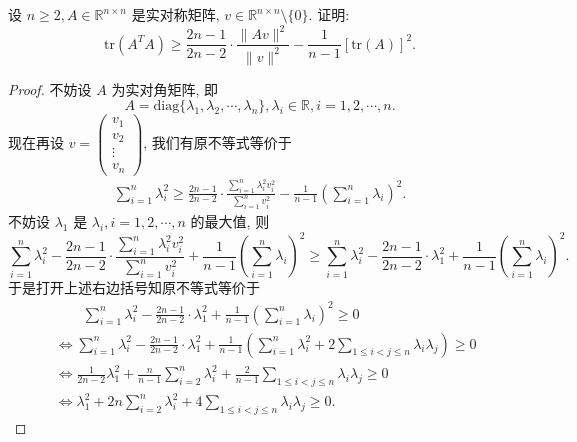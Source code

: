 \documentclass[../../main.tex]{subfiles}
\begin{document}
\begin{example}
设 \( n \geqslant 2, A \in \mathbb{R}^{n \times n} \) 是实对称矩阵, \( v \in \mathbb{R}^{n \times n} \setminus \{0\} \). 证明:
\[
\text{tr}(A^TA) \geqslant \frac{2n - 1}{2n - 2} \cdot \frac{\|Av\|^2}{\|v\|^2} - \frac{1}{n - 1}[\text{tr}(A)]^2.
\]
\end{example}
\begin{proof}
不妨设 \( A \) 为实对角矩阵, 即
\[
A = \text{diag}\{\lambda_1, \lambda_2, \cdots, \lambda_n\}, \lambda_i \in \mathbb{R}, i = 1,2,\cdots, n.
\]
现在再设 \( v = \begin{pmatrix} v_1 \\ v_2 \\ \vdots \\ v_n \end{pmatrix} \), 我们有原不等式等价于
\begin{align*}
\sum\limits_{i=1}^n \lambda_i^2 \geqslant \frac{2n - 1}{2n - 2} \cdot \frac{\sum\limits_{i=1}^n \lambda_i^2 v_i^2}{\sum\limits_{i=1}^n v_i^2} - \frac{1}{n - 1} \left( \sum\limits_{i=1}^n \lambda_i \right)^2. 
\end{align*}
不妨设 \( \lambda_1 \) 是 \( \lambda_i, i = 1,2,\cdots, n \) 的最大值, 则
\[
\sum\limits_{i=1}^n \lambda_i^2 - \frac{2n - 1}{2n - 2} \cdot \frac{\sum\limits_{i=1}^n \lambda_i^2 v_i^2}{\sum\limits_{i=1}^n v_i^2} + \frac{1}{n - 1} \left( \sum\limits_{i=1}^n \lambda_i \right)^2 \geqslant \sum\limits_{i=1}^n \lambda_i^2 - \frac{2n - 1}{2n - 2} \cdot \lambda_1^2 + \frac{1}{n - 1} \left( \sum\limits_{i=1}^n \lambda_i \right)^2.
\]
于是打开上述右边括号知原不等式等价于
\begin{align}
&\quad \quad \sum\limits_{i=1}^n{\lambda _{i}^{2}}-\frac{2n-1}{2n-2}\cdot \lambda _{1}^{2}+\frac{1}{n-1}\left( \sum\limits_{i=1}^n{\lambda _i} \right) ^2\geqslant 0
\nonumber \\
&\Longleftrightarrow \sum\limits_{i=1}^n{\lambda _{i}^{2}}-\frac{2n-1}{2n-2}\cdot \lambda _{1}^{2}+\frac{1}{n-1}\left( \sum\limits_{i=1}^n{\lambda _{i}^{2}}+2\sum\limits_{1\le i<j\le n}{\lambda _i\lambda _j} \right) \geqslant 0
\nonumber \\
&\Longleftrightarrow \frac{1}{2n-2}\lambda _{1}^{2}+\frac{n}{n-1}\sum\limits_{i=2}^n{\lambda _{i}^{2}}+\frac{2}{n-1}\sum\limits_{1\le i<j\le n}{\lambda _i\lambda _j}\geqslant 0
\nonumber \\
&\Longleftrightarrow \lambda _{1}^{2}+2n\sum\limits_{i=2}^n{\lambda _{i}^{2}}+4\sum\limits_{1\le i<j\le n}{\lambda _i\lambda _j}\geqslant 0.\label{eq:::-----1568165435
3615-11}
\end{align}

\end{proof}
\end{document}
